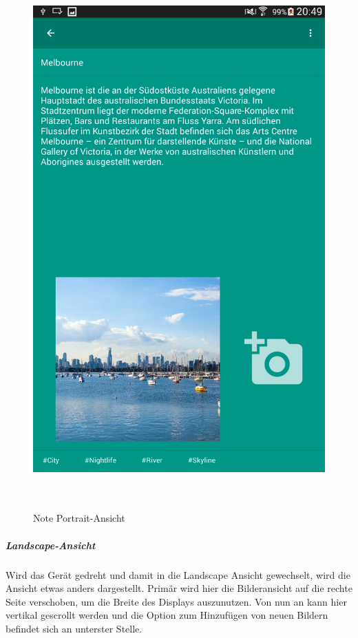 \begin{figure}[H]
\centering
\begin{minipage}[t]{1\textwidth} %
\caption{Note Portrait-Ansicht} %
\includegraphics[height=20cm]{img/note_portrait.png}\\ %
\end{minipage}
\end{figure}

\subparagraph{Landscape-Ansicht}
Wird das Gerät gedreht und damit in die Landscape Ansicht gewechselt, wird die Ansicht etwas anders dargestellt. Primär wird hier die Bilderansicht auf die rechte Seite verschoben, um die Breite des Displays auszunutzen. Von nun an kann hier vertikal gescrollt werden und die Option zum Hinzufügen von neuen Bildern befindet sich an unterster Stelle.

